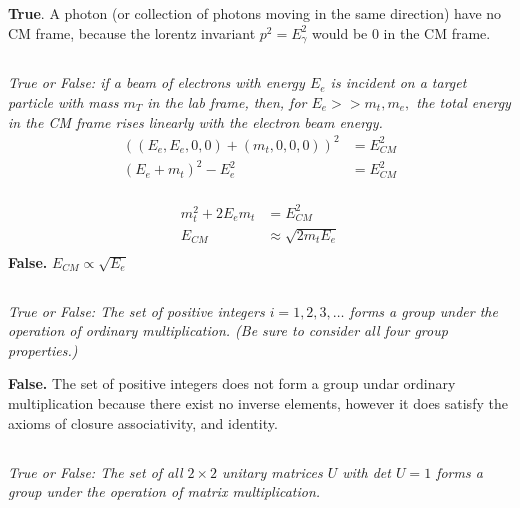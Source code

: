 \documentclass{article}
\begin{document}
\textbf{True}. A photon (or collection of photons moving in the same direction) have no CM frame, because the lorentz invariant $p^2 = E_\gamma ^2$ would be 0 in the CM frame. 

\subsection{}
\textit{True or False: if a beam of electrons with energy $E_{e}$ is incident on a target particle with mass $m_{T}$ in the lab frame, then, for $E_{e}>>m_{t}, m_{e},$ the total energy in the CM frame rises linearly with the electron beam energy.}
\begin{align*}
    \left(\left(E_{e}, E_{e}, 0,0\right)+\left(m_{t}, 0,0,0\right)\right)^{2}&=E_{C M}^{2}\\
    \left(E_{e}+m_{t}\right)^{2}-E_{e}^{2}&=E_{CM}^{2}\\
\end{align*}

\begin{align*}
    m_{t}^{2}+2 E_e m_{t}&=E_{CM}^{2}\\
    E_{CM} &\approx \sqrt{2 m_{t} E_{e}}\\
\end{align*}
\textbf{False.} $E_{CM} \propto \sqrt{E_e}$

\subsection{}
\textit{ True or False: The set of positive integers $i=1,2,3, \ldots$ forms a group under the operation of ordinary multiplication. (Be sure to consider all four group properties.)}

\textbf{False.} The set of positive integers does not form a group undar ordinary multiplication because there exist no inverse elements, however it does satisfy the axioms of closure associativity, and identity.

\subsection{}
\textit{ True or False: The set of all $2 \times 2$ unitary matrices $U$ with det $U=1$ forms a group under the operation of matrix multiplication.}
\end{document}
